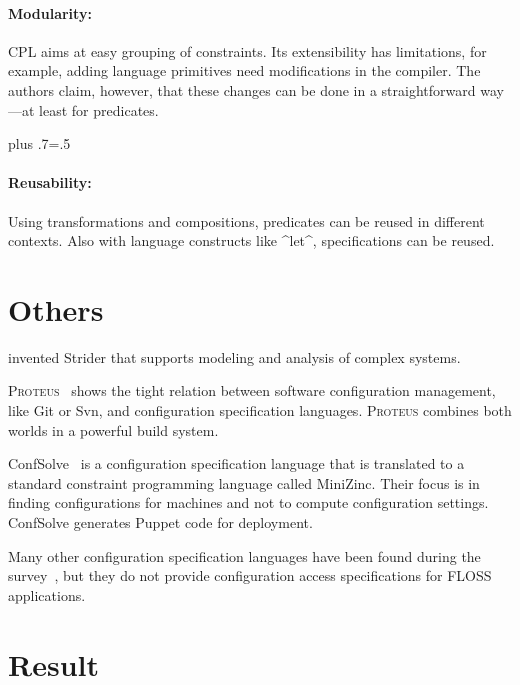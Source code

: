 \paragraph*{Modularity:}
CPL aims at easy grouping of constraints.
Its extensibility has limitations, for example, adding language primitives need modifications in the compiler.
The authors claim, however, that these changes can be done in a straightforward way---at least for predicates.%
{\parfillskip=0pt plus .7\textwidth \emergencystretch=.5\textwidth \par}

\paragraph*{Reusability:}
Using transformations and compositions, predicates can be reused in different contexts.
Also with language constructs like ^let^, specifications can be reused.


\section{Others}

\citet{lock2005strider} invented Strider that supports modeling and analysis of complex systems.

\textsc{Proteus}~\cite{tryggeseth1995modelling} shows the tight relation between software configuration management, like Git or Svn, and configuration specification languages.
\textsc{Proteus} combines both worlds in a powerful build system.

ConfSolve~\cite{hewson2011modelling,hewson2012declarative} is a configuration specification language that is translated to a standard constraint programming language called MiniZinc.
Their focus is in finding configurations for machines and not to compute configuration settings.
ConfSolve generates Puppet code for deployment.

Many other configuration specification languages have been found during the survey~\cite{roll2003towards,pandey2012investigating,hill2011modeling,anderson2002lcfg,deliverable1996tina,lujak2015orcas,sommerville1992configuration,giese2012industrial,huang2007system%
,novak2005automatic%
,gunther2012software,berger2013survey,magableh2010primitive,friedrich1999consistency}, but they do not provide configuration access specifications for FLOSS applications.

\section{Result}

